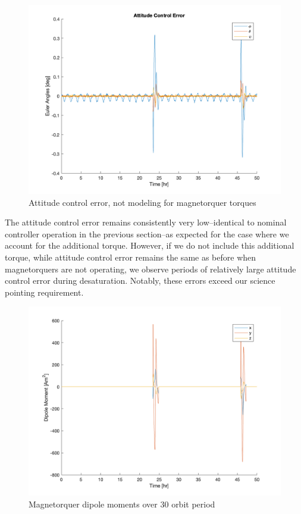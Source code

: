 \begin{figure}[H]
\centering
\includegraphics[scale=0.3]{Images/ps10_error_open_loop.png}
\caption{Attitude control error, not modeling for magnetorquer torques}
\label{fig:ps10_error_open_loop}
\end{figure}

The attitude control error remains consistently very low–identical to nominal controller operation in the previous section–as expected for the case where we account for the additional torque. However, if we do not include this additional torque, while attitude control error remains the same as before when magnetorquers are not operating, we observe periods of relatively large attitude control error during desaturation. Notably, these errors exceed our science pointing requirement.



\begin{figure}[H]
\centering
\includegraphics[scale=0.3]{Images/ps10_dipole_moment.png}
\caption{Magnetorquer dipole moments over 30 orbit period}
\label{fig:ps10_dipole_moment}
\end{figure}

